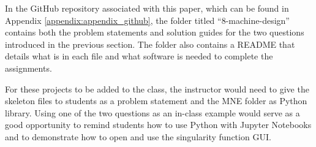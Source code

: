 In the GitHub repository associated with this paper, which can be found in Appendix \ref{appendix:appendix_github},
the folder titled ``8-machine-design'' contains both the problem statements and solution guides for the two questions
introduced in the previous section. The folder also contains a README that details what is in each file and 
what software is needed to complete the assignments. 

For these projects to be added to the class, the instructor would  need to give the skeleton files to 
students as a problem statement and the MNE folder as Python library. Using one of the two questions as an in-class
example would serve as a good opportunity to remind students how to use Python with Jupyter Notebooks and to 
demonstrate how to open and use the singularity function GUI.
